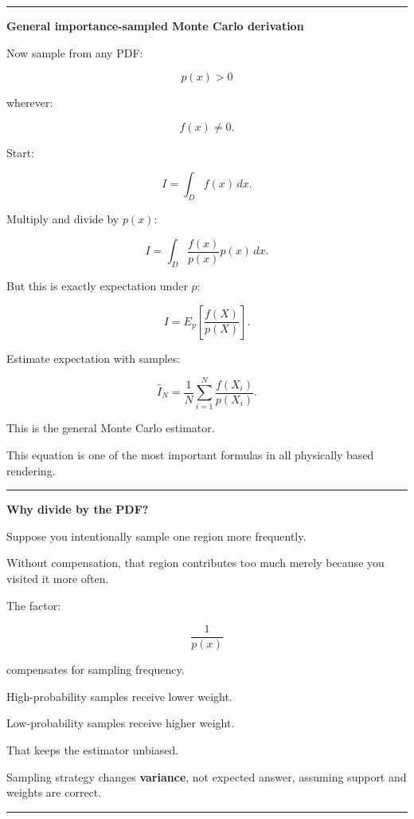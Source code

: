 \begin{center}\rule{0.5\linewidth}{0.5pt}\end{center}

\textbf{General importance-sampled Monte Carlo derivation}

Now sample from any PDF:

\[
p(x)>0
\]

wherever:

\[
f(x)\neq0.
\]

Start:

\[
I=
\int_D f(x)\,dx.
\]

Multiply and divide by \(p(x)\):

\[
I=
\int_D
\frac{f(x)}{p(x)}
p(x)\,dx.
\]

But this is exactly expectation under \(p\):

\[
\boxed{
I=
E_p
\left[
\frac{f(X)}{p(X)}
\right].
}
\]

Estimate expectation with samples:

\[
\boxed{
\hat I_N
=
\frac1N
\sum_{i=1}^{N}
\frac{
f(X_i)
}{
p(X_i)
}.
}
\]

This is the general Monte Carlo estimator.

This equation is one of the most important formulas in all physically based rendering.

\begin{center}\rule{0.5\linewidth}{0.5pt}\end{center}

\textbf{Why divide by the PDF?}

Suppose you intentionally sample one region more frequently.

Without compensation, that region contributes too much merely because you visited it more often.

The factor:

\[
\frac1{p(x)}
\]

compensates for sampling frequency.

High-probability samples receive lower weight.

Low-probability samples receive higher weight.

That keeps the estimator unbiased.

Sampling strategy changes \textbf{variance}, not expected answer, assuming support and weights are correct.

\begin{center}\rule{0.5\linewidth}{0.5pt}\end{center}

